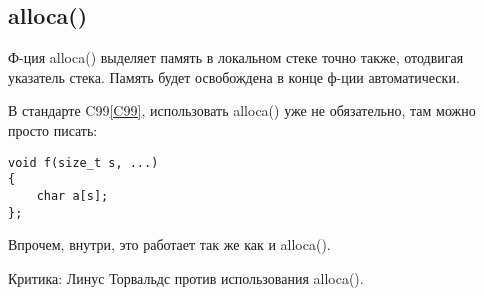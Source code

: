 ﻿\subsection{alloca()}

Ф-ция alloca() выделяет память в локальном стеке точно также, отодвигая указатель стека\cite[1.2.4]{REBook}.
Память будет освобождена в конце ф-ции автоматически.

В стандарте C99\ref{C99}, использовать alloca() уже не обязательно, там можно просто писать:

\begin{lstlisting}
void f(size_t s, ...)
{
	char a[s];
};
\end{lstlisting}

Впрочем, внутри, это работает так же как и alloca().

Критика: Линус Торвальдс против использования alloca()\cite{Torvalds:2003}.
